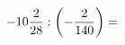\documentclass[preview]{standalone}
\begin{document}
\begin{align*}
-10 { 2 \over 28 }  :  \left( - { 2 \over 140 } \right)  =
\end{align*}
\end{document}
